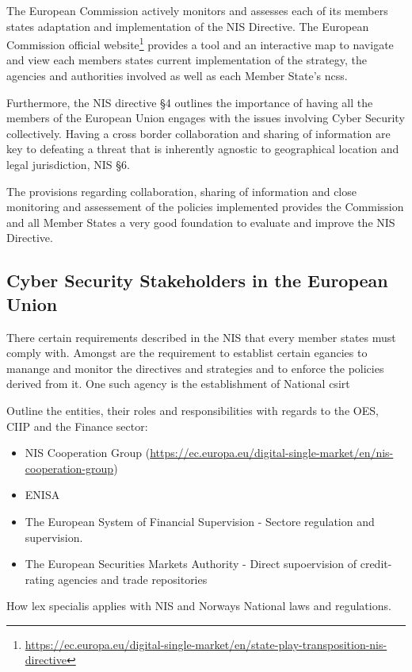 The European Commission actively monitors and assesses each of its members states adaptation and implementation of the NIS Directive. The European Commission official website\footnote[3]{\url{https://ec.europa.eu/digital-single-market/en/state-play-transposition-nis-directive}} provides a tool and an interactive map to navigate and view each members states current implementation of the strategy, the agencies and authorities involved as well as each Member State's \acrshort{ncss}.

Furthermore, the NIS directive §4 outlines the importance of having all the members of the European Union engages with the issues involving Cyber Security collectively. Having a cross border collaboration and sharing of information are key to defeating a threat that is inherently agnostic to geographical location and legal jurisdiction, NIS §6. \cite{VIIRA2018} 

The provisions regarding collaboration, sharing of information and close monitoring and assessement of the policies implemented provides the Commission and all Member States a very good foundation to evaluate and improve the NIS Directive.


\subsection{Cyber Security Stakeholders in the European Union}

There certain requirements described in the NIS that every member states must comply with. Amongst are the requirement to establist certain egancies to manange and monitor the directives and strategies and to enforce the policies derived from it. One such agency is the establishment of National \acrfull{csirt}


\begin{followup}
    Outline the entities, their roles and responsibilities with regards to the OES, CIIP and the Finance sector:
    \begin{itemize}
        \item NIS Cooperation Group (\url{https://ec.europa.eu/digital-single-market/en/nis-cooperation-group})
        \item ENISA
        \item The European System of Financial Supervision - Sectore regulation and supervision.
        \item The European Securities Markets Authority - Direct supoervision of credit-rating agencies and trade repositories
    \end{itemize}

    How lex specialis applies with NIS and Norways National laws and regulations.
\end{followup}


